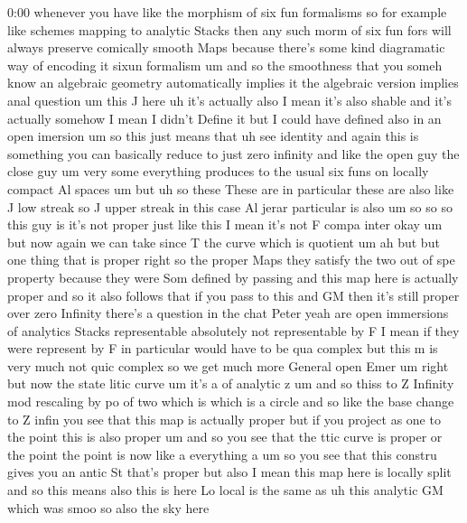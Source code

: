 \begin{unfinished}{0:00}
whenever  you  have  like  the  morphism  of
six  fun  formalisms  so  for  example  like
schemes  mapping  to  analytic
Stacks  then  any  such  morm  of  six  fun
fors  will  always  preserve  comically
smooth
Maps  because  there's  some  kind
diagramatic  way  of  encoding  it  sixun
formalism  um  and  so  the  smoothness  that
you  someh  know  an  algebraic  geometry
automatically  implies
it  the  algebraic  version  implies  anal
question
um  this  J
here  uh  it's  actually  also  I  mean  it's
also
shable  and  it's  actually
somehow  I  mean  I  didn't  Define  it  but  I
could  have  defined  also  in  an  open
imersion
um  so  this  just  means  that
uh  see  identity  and  again  this  is
something  you  can  basically  reduce  to
just  zero  infinity  and  like  the  open  guy
the  close  guy  um  very  some  everything
produces  to  the  usual  six  funs  on
locally  compact  Al
spaces
um  but  uh  so  these  These  are  in
particular  these  are  also
like  J  low  streak  so  J  upper  streak  in
this  case  Al
jerar  particular  is
also
um  so  so  so  this  guy
is  it's  not
proper  just  like  this  I  mean  it's  not  F
compa
inter  okay
um  but  now  again  we  can  take  since  T  the
curve  which  is
quotient  um  ah  but  but  one  thing  that  is
proper  right  so  the  proper  Maps  they
satisfy  the  two  out  of  spe  property
because  they  were  Som  defined  by  passing
and  this  map  here  is  actually
proper  and  so  it  also  follows  that  if
you  pass  to  this  and  GM
then  it's  still
proper  over  zero
Infinity  there's  a  question  in  the  chat
Peter  yeah  are  open  immersions  of
analytics  Stacks  representable
absolutely  not  representable  by  F  I  mean
if  they  were  represent  by  F  in
particular  would  have  to  be  qua  complex
but  this  m  is  very  much  not  quic
complex  so  we  get  much  more  General  open
Emer
um  right  but  now  the  state  litic  curve
um  it's  a  of
analytic
z  um  and  so  thiss
to  Z  Infinity  mod  rescaling  by  po  of  two
which  is  which  is  a
circle  and
so  like  the  base  change  to  Z  infin  you
see  that  this  map  is  actually  proper  but
if  you  project  as  one  to  the  point  this
is  also
proper  um  and  so  you  see  that  the  ttic
curve  is  proper  or  the  point  the  point
is  now  like
a  everything
a  um  so  you  see
that  this  constru  gives  you  an  antic  St
that's
proper  but  also  I  mean  this  map  here  is
locally  split  and  so  this  means  also
this  is  here
Lo  local  is  the  same  as  uh  this  analytic
GM  which  was  smoo  so  also  the  sky  here

\end{unfinished}

